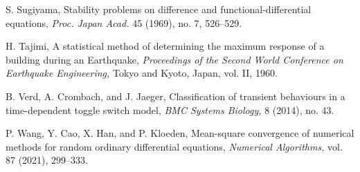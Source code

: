 \documentclass[reqno,12pt]{amsart}
\theoremstyle{plain} %
\theoremstyle{definition} %
\begin{document}
\begin{thebibliography}{25}
     S. Sugiyama, Stability problems on difference and functional-differential equations, \emph{Proc. Japan Acad.} 45 (1969), no. 7, 526--529. %

     H. Tajimi, A statistical method of determining the maximum response of a building during an Earthquake, \emph{Proceedings of the Second World Conference on Earthquake Engineering,} Tokyo and Kyoto, Japan, vol. II, 1960.
    
     B. Verd, A. Crombach, and J. Jaeger, Classification of transient behaviours in a time-dependent toggle switch model, \emph{BMC Systems Biology,} 8 (2014), no. 43.

     P. Wang, Y. Cao, X. Han, and P. Kloeden, Mean-square convergence of numerical methods for random ordinary differential equations, \emph{Numerical Algorithms,} vol. 87 (2021), 299--333.

\end{thebibliography}
\end{document}
